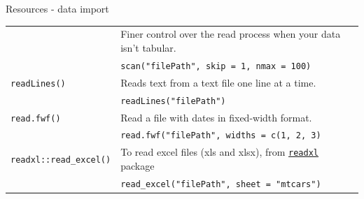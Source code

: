 \documentclass[8pt,ignorenonframetext,]{beamer}
\begin{document}
\begin{frame}[fragile]{Resources - data import}
\begin{longtable}[]{@{}ll@{}}
\begin{minipage}[t]{0.25\columnwidth}
\end{minipage} & \begin{minipage}[t]{0.69\columnwidth}\raggedright\strut
Finer control over the read process when your data isn't tabular.\strut
\end{minipage}\tabularnewline
\begin{minipage}[t]{0.25\columnwidth}\raggedright\strut
\strut
\end{minipage} & \begin{minipage}[t]{0.69\columnwidth}\raggedright\strut
\texttt{scan("filePath",\ skip\ =\ 1,\ nmax\ =\ 100)}\strut
\end{minipage}\tabularnewline
\begin{minipage}[t]{0.25\columnwidth}\raggedright\strut
\texttt{readLines()}\strut
\end{minipage} & \begin{minipage}[t]{0.69\columnwidth}\raggedright\strut
Reads text from a text file one line at a time.\strut
\end{minipage}\tabularnewline
\begin{minipage}[t]{0.25\columnwidth}\raggedright\strut
\strut
\end{minipage} & \begin{minipage}[t]{0.69\columnwidth}\raggedright\strut
\texttt{readLines("filePath")}\strut
\end{minipage}\tabularnewline
\begin{minipage}[t]{0.25\columnwidth}\raggedright\strut
\texttt{read.fwf()}\strut
\end{minipage} & \begin{minipage}[t]{0.69\columnwidth}\raggedright\strut
Read a file with dates in fixed-width format.\strut
\end{minipage}\tabularnewline
\begin{minipage}[t]{0.25\columnwidth}\raggedright\strut
\strut
\end{minipage} & \begin{minipage}[t]{0.69\columnwidth}\raggedright\strut
\texttt{read.fwf("filePath",\ widths\ =\ c(1,\ 2,\ 3)}\strut
\end{minipage}\tabularnewline
\begin{minipage}[t]{0.25\columnwidth}\raggedright\strut
\texttt{readxl::read\_excel()}\strut
\end{minipage} & \begin{minipage}[t]{0.69\columnwidth}\raggedright\strut
To read excel files (xls and xlsx), from
\href{https://cran.r-project.org/web/packages/readxl/index.html}{\texttt{readxl}}
package\strut
\end{minipage}\tabularnewline
\begin{minipage}[t]{0.25\columnwidth}\raggedright\strut
\strut
\end{minipage} & \begin{minipage}[t]{0.69\columnwidth}\raggedright\strut
\texttt{read\_excel("filePath",\ sheet\ =\ "mtcars")}\strut
\end{minipage}\tabularnewline
\bottomrule
\end{longtable}


\end{frame}
\end{document}
